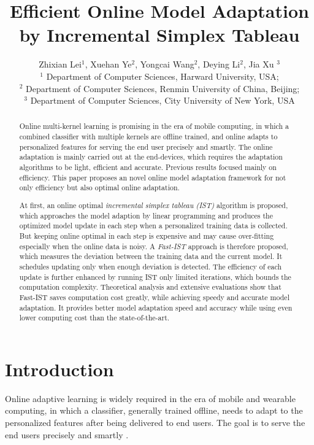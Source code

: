 \documentclass[letterpaper]{article}
\title{Efficient Online  Model Adaptation by Incremental Simplex Tableau}
\author{Zhixian Lei$^1$, Xuehan Ye$^2$, Yongcai Wang$^2$\footnotemark,   Deying Li$^2$, Jia Xu $^3$\\
$^1$ Department of Computer Sciences, Harward University, USA; \\$^2$ Department of Computer Sciences, Renmin University of China, Beijing; \\$^3$ Department of Computer Sciences, City University of New York, USA
}
\begin{document}
\maketitle
{}

\begin{abstract}
Online multi-kernel learning is promising in the era of mobile computing, in which a combined classifier with multiple kernels are offline trained, and online adapts to personalized features for serving the end user precisely and smartly. The online adaptation is mainly carried out at the end-devices, which requires the adaptation algorithms to be light, efficient and accurate. Previous results focused mainly on efficiency.
This paper proposes an novel online model adaptation framework for not only efficiency but also optimal online adaptation.

At first, an online optimal \emph{incremental simplex tableau (IST)} algorithm is proposed, which approaches the model adaption by linear programming and produces the optimized model update in each step when a personalized training data is collected.
But keeping online optimal in each step is expensive and may cause over-fitting especially when the online data is noisy. A  \emph{Fast-IST} approach is therefore proposed, which  measures the deviation between the training data and the current model. It schedules updating only when enough deviation is detected. The efficiency of each update is further enhanced by running IST only limited iterations,  which bounds the computation complexity. Theoretical analysis and extensive evaluations show that Fast-IST saves computation cost greatly, while achieving speedy and accurate model adaptation.  It provides better model adaptation speed and accuracy while using even lower computing cost than the state-of-the-art.
\end{abstract}

\section{Introduction}
Online adaptive learning is widely required in the era of mobile and wearable computing\cite{SongSurvey}, in which a classifier, generally trained offline, needs to adapt to the personalized features after being delivered to end users. The goal is to serve the end users precisely and smartly \cite{Gu20051}.

\end{document}
